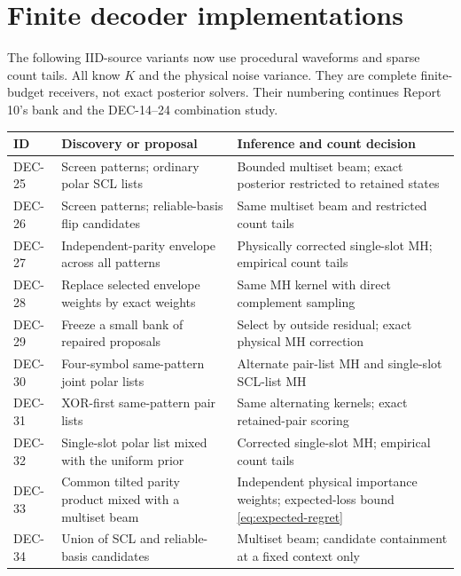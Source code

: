 \documentclass[10pt,a4paper]{article}
\begin{document}
\section{Finite decoder implementations}
The following IID-source variants now use procedural waveforms and sparse count tails. All know $K$
and the physical noise variance. They are complete finite-budget receivers, not exact posterior solvers.
Their numbering continues Report 10's bank and the DEC-14--24 combination study.

\begin{center}\small
\begin{tabularx}{\textwidth}{@{}lYY@{}}\toprule
ID & Discovery or proposal & Inference and count decision\\\midrule
DEC-25 & Screen patterns; ordinary polar SCL lists & Bounded multiset beam; exact posterior restricted to retained states\\
DEC-26 & Screen patterns; reliable-basis flip candidates & Same multiset beam and restricted count tails\\
DEC-27 & Independent-parity envelope across all patterns & Physically corrected single-slot MH; empirical count tails\\
DEC-28 & Replace selected envelope weights by exact weights & Same MH kernel with direct complement sampling\\
DEC-29 & Freeze a small bank of repaired proposals & Select by outside residual; exact physical MH correction\\
DEC-30 & Four-symbol same-pattern joint polar lists & Alternate pair-list MH and single-slot SCL-list MH\\
DEC-31 & XOR-first same-pattern pair lists & Same alternating kernels; exact retained-pair scoring\\
DEC-32 & Single-slot polar list mixed with the uniform prior & Corrected single-slot MH; empirical count tails\\
DEC-33 & Common tilted parity product mixed with a multiset beam & Independent physical importance weights; expected-loss bound \eqref{eq:expected-regret}\\
DEC-34 & Union of SCL and reliable-basis candidates & Multiset beam; candidate containment at a fixed context only\\\bottomrule
\end{tabularx}
\end{center}
\end{document}
